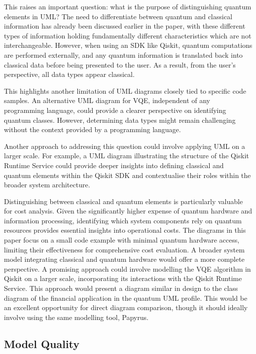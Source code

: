 \documentclass{article}
\begin{document}
This raises an important question: what is the purpose of distinguishing quantum elements in UML? The need to differentiate between quantum and classical information has already been discussed earlier in the paper, with these different types of information holding fundamentally different characteristics which are not interchangeable. However, when using an SDK like Qiskit, quantum computations are performed externally, and any quantum information is translated back into classical data before being presented to the user. As a result, from the user’s perspective, all data types appear classical. 

This highlights another limitation of UML diagrams closely tied to specific code samples. An alternative UML diagram for VQE, independent of any programming language, could provide a clearer perspective on identifying quantum classes. However, determining data types might remain challenging without the context provided by a programming language.

Another approach to addressing this question could involve applying UML on a larger scale. For example, a UML diagram illustrating the structure of the Qiskit Runtime Service could provide deeper insights into defining classical and quantum elements within the Qiskit SDK and contextualise their roles within the broader system architecture. 

Distinguishing between classical and quantum elements is particularly valuable for cost analysis. Given the significantly higher expense of quantum hardware and information processing, identifying which system components rely on quantum resources provides essential insights into operational costs. The diagrams in this paper focus on a small code example with minimal quantum hardware access, limiting their effectiveness for comprehensive cost evaluation. A broader system model integrating classical and quantum hardware would offer a more complete perspective. A promising approach could involve modelling the VQE algorithm in Qiskit on a larger scale, incorporating its interactions with the Qiskit Runtime Service. This approach would present a diagram similar in design to the class diagram of the financial application in the quantum UML profile\cite{Pérez-Castillo2022}. This would be an excellent opportunity for direct diagram comparison, though it should ideally involve using the same modelling tool, Papyrus.

\subsection{Model Quality}
\end{document}
